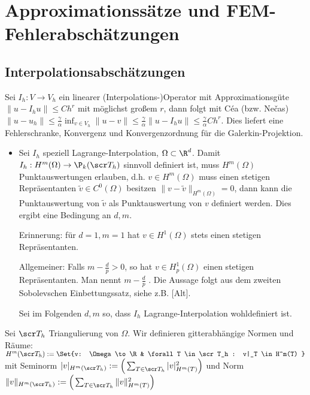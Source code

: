 \section{Approximationssätze und FEM-Fehlerabschätzungen} \label{sec:3.5}


\subsection*{Interpolationsabschätzungen}

Sei $I_h: V \to V_h$ ein linearer (Interpolations-)Operator mit Approximationsgüte $\|u - I_h u\| \le C h^r$ mit möglichst großem $r$, dann folgt mit Céa (bzw. Nečas)
\begin{math}
	\|u - u_h\| \le \frac{\gamma}{\alpha} \inf_{v\in V_h} \|u - v\|
	\le \frac{\gamma}{\alpha} \|u - I_h u\|
	\le \frac{\gamma}{\alpha} C h^r.
\end{math}
Dies liefert eine Fehlerschranke, Konvergenz und Konvergenzordnung für die Galerkin-Projektion.

\begin{itemize}
	\item
		Sei $I_h$ speziell Lagrange-Interpolation, $\Omega \subset \R^d$.
		Damit $I_h: H^m(\Omega) \to \P_k(\scr T_h)$ sinnvoll definiert ist, muss $H^m(\Omega)$ Punktauswertungen erlauben, d.h. $v \in H^m(\Omega)$ muss einen stetigen Repräsentanten $\tilde v \in C^0(\Omega)$ besitzen $\|v - \tilde v\|_{H^m(\Omega)} = 0$, dann kann die Punktauswertung von $\tilde v$ als Punktauswertung von $v$ definiert werden.
		Dies ergibt eine Bedingung an $d, m$.

		Erinnerung: für $d = 1, m = 1$ hat $v \in H^1(\Omega)$ stets einen stetigen Repräsentanten.

		Allgemeiner: Falls $m - \frac{d}{p} > 0$, so hat $v \in H_p^1(\Omega)$ einen stetigen Repräsentanten.
		Man nennt $m - \frac{d}{p}$ .
		Die Aussage folgt aus dem zweiten Sobolevschen Einbettungssatz, siehe z.B. [Alt].

		Sei im Folgenden $d,m$ so, dass $I_h$ Lagrange-Interpolation wohldefiniert ist.
\end{itemize}



\begin{df} \label{3.75}
	Sei $\scr T_h$ Triangulierung von $\Omega$.
	Wir definieren gitterabhängige Normen und Räume:
	\begin{math}
		H^m(\scr T_h) := \Set{v: \Omega \to \R & \forall T \in \scr T_h : v|_T \in H^m(T) }
	\end{math}
	mit Seminorm
	\begin{math}
		|v|_{H^m(\scr T_h)} := \Big( \sum_{T\in \scr T_h} |v|_{H^m(T)}^2 \Big)
	\end{math}
	und Norm
	\begin{math}
		\|v\|_{H^m(\scr T_h)} := \Big( \sum_{T\in \scr T_h} \|v\|_{H^m(T)}^2 \Big)
	\end{math}
\end{df}


